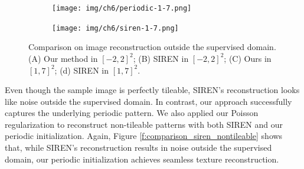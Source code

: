 \begin{figure}[!ht]
\begin{subfigure}{0.24\textwidth}
        \caption{} \label{fig:comp-b}
      \end{subfigure}
      \begin{subfigure}{0.24\textwidth}
        \texttt{[image: img/ch6/periodic-1-7.png]}
        \caption{} \label{fig:comp-c}
      \end{subfigure}
      \begin{subfigure}{0.24\textwidth}
        \texttt{[image: img/ch6/siren-1-7.png]}
        \caption{} \label{fig:comp-d}
      \end{subfigure}
    \caption{Comparison on image reconstruction outside the supervised domain. (A) Our method in $[-2, 2]^2$; (B) SIREN in $[-2, 2]^2$; (C) Ours in $[1, 7]^2$; (d) SIREN in $[1, 7]^2$.} 
    \label{f:siren-comparison}
\end{figure}

Even though the sample image is perfectly tileable, SIREN's reconstruction looks like noise outside the supervised domain. In contrast, our approach successfully captures the underlying periodic pattern. We also applied our Poisson regularization to reconstruct non-tileable patterns with both SIREN and our periodic initialization. Again, Figure \ref{f:comparison_siren_nontileable} shows that, while SIREN's reconstruction results in noise outside the supervised domain, our periodic initialization achieves seamless texture reconstruction.


